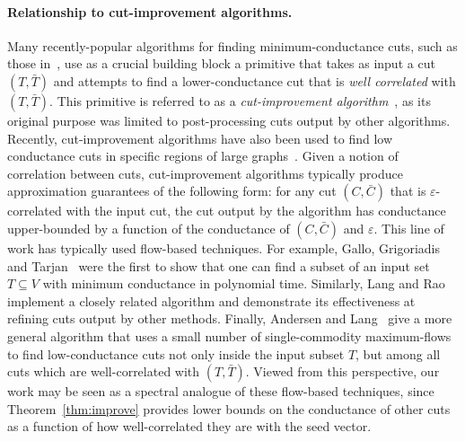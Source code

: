 \documentclass[11pt]{article}
\begin{document}
\paragraph{Relationship to cut-improvement algorithms.}
Many recently-popular algorithms for finding minimum-conductance cuts, 
such as those in~\cite{khandekar06_partitioning,OSVV08}, use as a crucial 
building block a primitive that takes as input a cut $(T, \bar{T})$ and 
attempts to find a lower-conductance cut that is {\em well correlated} 
with $(T, \bar{T})$. 
This primitive is referred to as a \emph{cut-improvement 
algorithm}~\cite{kevin04mqi,andersen08soda}, as its original purpose was 
limited to post-processing cuts output by other algorithms. 
Recently, cut-improvement algorithms have also been used to find low 
conductance cuts in specific regions of large graphs~\cite{LLM10_communities_CONF}. 
Given a notion of correlation between cuts, cut-improvement algorithms 
typically produce approximation guarantees of the following form:
for any cut $(C, \bar{C})$ that is $\varepsilon $-correlated with the input 
cut, the cut output by the algorithm has conductance upper-bounded by a 
function of the conductance of $(C, \bar{C})$ and $\varepsilon $.
This line of work has typically used flow-based techniques.
For example, Gallo, Grigoriadis and Tarjan~\cite{Gallo:1989} were the first 
to show that one can find a subset of an input set $T \subseteq V$ with 
minimum conductance in polynomial time. 
Similarly, Lang and Rao~\cite{kevin04mqi} implement a closely related 
algorithm and demonstrate its effectiveness at refining cuts output by other 
methods. 
Finally, Andersen and Lang~\cite{andersen08soda} give a more general 
algorithm that uses a small number of single-commodity maximum-flows to find 
low-conductance cuts not only inside the input subset $T$, but among all 
cuts which are well-correlated with $(T, \bar{T})$. 
Viewed from this perspective, our work may be seen as a spectral analogue 
of these flow-based techniques, since Theorem~\ref{thm:improve} provides 
lower bounds on the conductance of other cuts as a function of how 
well-correlated they are with the seed vector.
\end{document}
